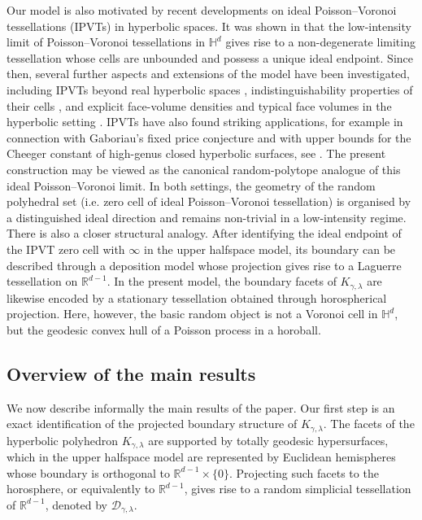 \documentclass[11pt,a4paper]{article}
\theoremstyle{plain}
\theoremstyle{definition}
\theoremstyle{remark}
\def\HH{\mathbb{H}}
\def\RR{\mathbb{R}}
\def\cD{\mathcal{D}}
\begin{document}
Our model is also motivated by recent developments on ideal
Poisson--Voronoi tessellations (IPVTs) in hyperbolic spaces. It was shown in
\cite{DCE+26} that the low-intensity limit of Poisson--Voronoi
tessellations in $\HH^d$ gives rise to a non-degenerate limiting
tessellation whose cells are unbounded and possess a unique ideal endpoint.
Since then, several further aspects and extensions of the model have been
investigated, including IPVTs beyond real hyperbolic spaces
\cite{Dachille2024,DachilleGrebikKhezeliReckeWilkens2025,DachilleKhezeli2026}, indistinguishability properties of
their cells \cite{Mellick2024}, and explicit face-volume densities and
typical face volumes in the hyperbolic setting
\cite{DachilleThaele2026}. IPVTs have also
found striking applications, for example in connection with Gaboriau's fixed
price conjecture and with upper bounds for the Cheeger constant of
high-genus closed hyperbolic surfaces, see
\cite{Application1,Application2}. The present construction may be viewed as the canonical random-polytope
analogue of this ideal Poisson--Voronoi limit.  In both settings, the geometry of the random polyhedral set (i.e. zero cell of ideal Poisson--Voronoi tessellation)
is organised by a distinguished ideal direction and remains non-trivial in
a low-intensity regime. There is also a closer structural analogy. After
identifying the ideal endpoint of the IPVT zero cell with $\infty$ in the upper halfspace model, its boundary
can be described through a deposition model whose projection gives rise to
a Laguerre tessellation on $\RR^{d-1}$. In the present model, the boundary
facets of $K_{\gamma,\lambda}$ are likewise encoded by a stationary
tessellation obtained through horospherical projection. Here, however, the
basic random object is not a Voronoi cell in $\HH^d$, but the geodesic
convex hull of a Poisson process in a horoball.

\subsection{Overview of the main results}

We now describe informally the main results of the paper. Our first step is
an exact identification of the projected boundary structure of
$K_{\gamma,\lambda}$. The facets of the hyperbolic polyhedron
$K_{\gamma,\lambda}$ are supported by totally geodesic hypersurfaces, which
in the upper halfspace model are represented by Euclidean hemispheres
whose boundary is orthogonal to $\RR^{d-1}\times\{0\}$. Projecting such facets to the
horosphere, or equivalently to  $\RR^{d-1}$,
gives rise to a random simplicial tessellation of $\RR^{d-1}$, denoted by
$\cD_{\gamma,\lambda}$.
\end{document}

